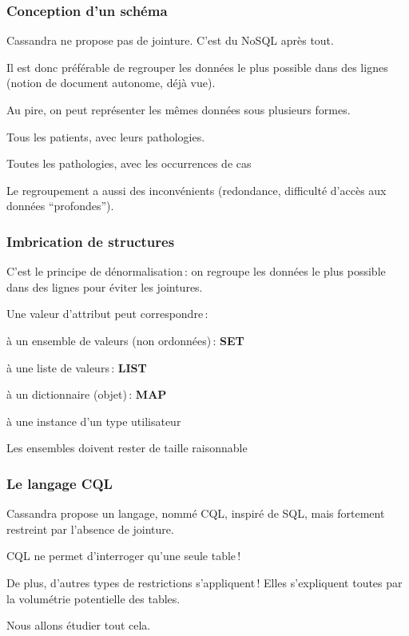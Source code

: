 
\begin{frame}
\frametitle{Conception d'un schéma}

\alert{Cassandra ne propose pas de jointure}. C'est du NoSQL après tout.

\vfill

Il est donc préférable de \alert{regrouper} les données le plus possible dans des lignes
(notion de document autonome, déjà vue).

\vfill


Au pire, on peut représenter les mêmes données sous plusieurs formes.

\begin{redbullet}
  \item Tous les patients, avec leurs pathologies.
  \item Toutes les pathologies, avec les occurrences de cas
\end{redbullet}


\vfill

Le regroupement a aussi des inconvénients (redondance, difficulté d'accès aux
données ``profondes''). 
\end{frame}


\begin{frame}[fragile]
\frametitle{Imbrication de structures}

C'est le principe de dénormalisation\,: on regroupe 
les données le plus possible dans des lignes pour éviter les jointures.

\vfill

Une valeur d'attribut  peut correspondre\,:
\begin{redbullet}
	\item à un ensemble de valeurs (non ordonnées)\,: \textbf{SET} 
	\item à une liste de valeurs\,: \textbf{LIST}
	\item à un dictionnaire (objet)\,: \textbf{MAP} 
	\item à une instance d'un type utilisateur
\end{redbullet}

\vfill

Les ensembles doivent rester de taille raisonnable
\end{frame}


\begin{frame} \frametitle{Le langage CQL}

Cassandra propose un langage, nommé CQL, inspiré de SQL, 
mais fortement restreint par l'absence de jointure. 

\vfill

CQL ne permet d'interroger qu'une seule table\,!

\vfill

De plus, d'autres types de restrictions s'appliquent\,! Elles s'expliquent toutes
par la volumétrie potentielle des tables.

\vfill

Nous allons étudier
tout cela.
\end{frame}



